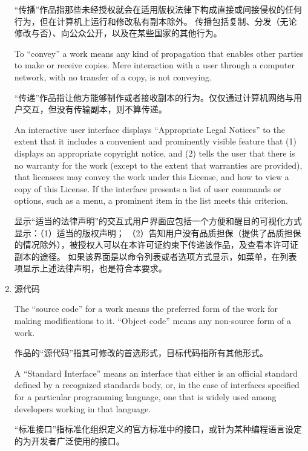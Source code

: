 \documentclass[11pt]{article}
\begin{document}
\begin{enumerate}
        “传播”作品指那些未经授权就会在适用版权法律下构成直接或间接侵权的任何行为，但在计算机上运行和修改私有副本除外。
        传播包括复制、分发（无论修改与否）、向公众公开，以及在某些国家的其他行为。

        To ``convey'' a work means any kind of propagation that enables other
        parties to make or receive copies.  Mere interaction with a user through
        a computer network, with no transfer of a copy, is not conveying.

        “传递”作品指让他方能够制作或者接收副本的行为。仅仅通过计算机网络与用户交互，但没有传输副本，则不算传递。

        An interactive user interface displays ``Appropriate Legal Notices''
        to the extent that it includes a convenient and prominently visible
        feature that (1) displays an appropriate copyright notice, and (2)
        tells the user that there is no warranty for the work (except to the
        extent that warranties are provided), that licensees may convey the
        work under this License, and how to view a copy of this License.  If
        the interface presents a list of user commands or options, such as a
        menu, a prominent item in the list meets this criterion.

        显示“适当的法律声明”的交互式用户界面应包括一个方便和醒目的可视化方式显示：（1）适当的版权声明；
        （2）告知用户没有品质担保（提供了品质担保的情况除外），被授权人可以在本许可证约束下传递该作品，及查看本许可证副本的途径。
        如果该界面是以命令列表或者选项方式显示，如菜单，在列表项显示上述法律声明，也是符合本要求。


  \item 源代码

        The ``source code'' for a work means the preferred form of the work
        for making modifications to it.  ``Object code'' means any non-source
        form of a work.

        作品的“源代码”指其可修改的首选形式，目标代码指所有其他形式。

        A ``Standard Interface'' means an interface that either is an official
        standard defined by a recognized standards body, or, in the case of
        interfaces specified for a particular programming language, one that
        is widely used among developers working in that language.

        “标准接口”指标准化组织定义的官方标准中的接口，或针为某种编程语言设定的为开发者广泛使用的接口。


\end{enumerate}
\end{document}
